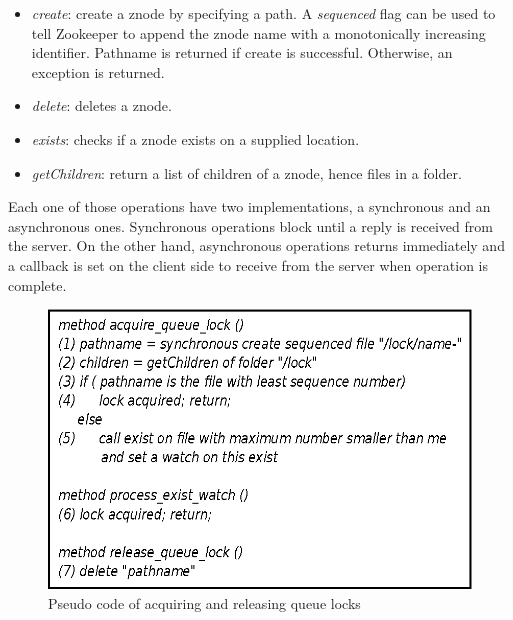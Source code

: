 \begin{itemize}
\item{\emph{create}: create a znode by specifying a path. A \emph{sequenced} flag can be used to tell Zookeeper to append the znode name with a monotonically increasing identifier. Pathname is returned if create is successful. Otherwise, an exception is returned.}
\item{\emph{delete}: deletes a znode.}
\item{\emph{exists}: checks if a znode exists on a supplied location.}
\item{\emph{getChildren}: return a list of children of a znode, hence files in a folder.}
\end{itemize}
Each one of those operations have two implementations, a synchronous and an asynchronous ones. Synchronous operations block until a reply is received from the server. On the other hand, asynchronous operations returns immediately and a callback is set on the client side to receive from the server when operation is complete.

\begin{figure}[ht]
\centering
\includegraphics[scale=0.85]{img/queue_lock_pseudo.eps}
\caption{Pseudo code of acquiring and releasing queue locks}
\label{fig:queue_lock_pseudo}
\end{figure}

